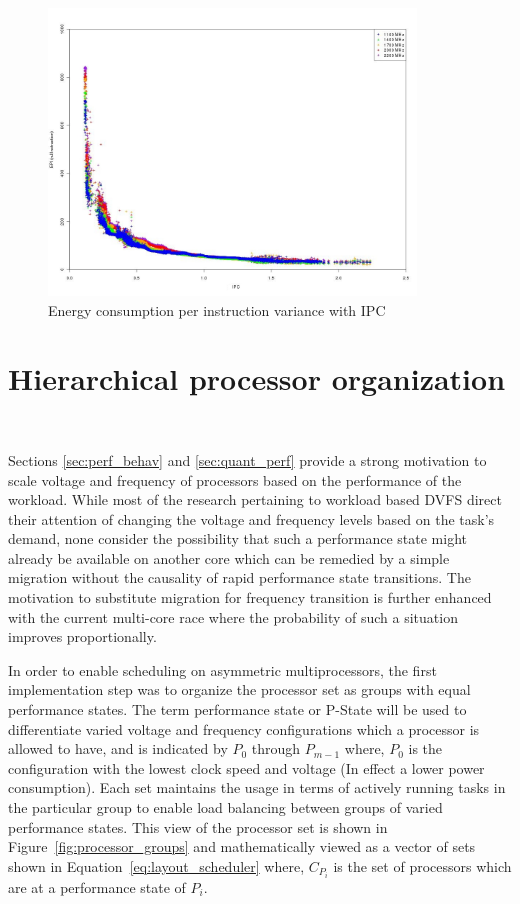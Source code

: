 \begin{figure}[h!]
  \begin{center}
    \includegraphics[height=3in]{figures/ipc_epi.jpg}
    \caption{Energy consumption per instruction variance with IPC}
    \label{fig:ipc_epi}
  \end{center}
\end{figure}

\section{Hierarchical processor organization}~\label{sec:proc_org}

Sections \ref{sec:perf_behav} and \ref{sec:quant_perf}  provide a strong motivation to
scale voltage and frequency of processors based on the performance of the workload.
While most of the research pertaining to workload based DVFS direct their attention of changing the voltage and frequency levels
based on the task's demand, none consider the possibility that such a performance state might
already be available on another core which can be remedied by a simple migration without the 
causality of rapid performance state transitions. The motivation to substitute migration for
frequency transition is further enhanced with the current multi-core race where the probability
of such a situation improves proportionally.  

In order to enable scheduling on asymmetric multiprocessors, the first implementation
step was to organize the processor set as groups with equal performance states. 
The term performance state or P-State will be used to differentiate varied voltage and
frequency configurations which a processor is allowed to have, and is indicated by
$P_{0}$ through $P_{m-1}$ where, $P_0$ is the configuration with the lowest clock speed
and voltage (In effect a lower power consumption). Each set maintains the usage in terms
of actively running tasks in the particular group to enable load balancing between 
groups of varied performance states. This view of the processor set is shown in
Figure~\ref{fig:processor_groups} and mathematically viewed as a vector of sets shown in Equation~\eqref{eq:layout_scheduler}
where, $C_{P_{i}}$ is the set of processors which are at a performance state of $P_{i}$.

